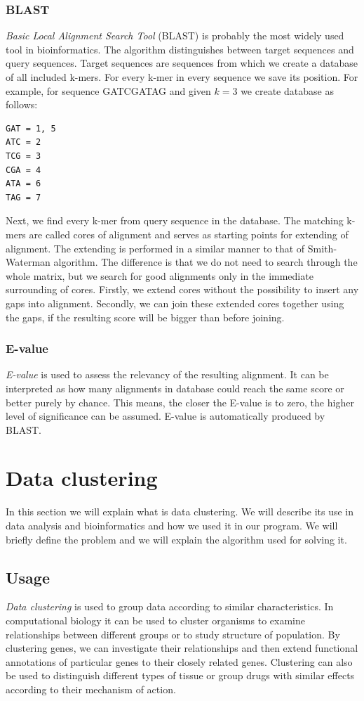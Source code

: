 \subsubsection{BLAST}
\emph{Basic Local Alignment Search Tool} (BLAST) \cite{blast} is probably the most widely used tool in bioinformatics.
The algorithm distinguishes between target sequences and query sequences.
Target sequences are sequences from which we create a database of all included k-mers.
For every k-mer in every sequence we save its position.
For example, for sequence GATCGATAG and given $k=3$ we create database as follows:
\begin{verbatim}
GAT = 1, 5
ATC = 2
TCG = 3
CGA = 4
ATA = 6
TAG = 7
\end{verbatim}
Next, we find every k-mer from query sequence in the database.
The matching k-mers are called cores of alignment and serves as starting points for extending of alignment.
The extending is performed in a similar manner to that of Smith-Waterman algorithm.
The difference is that we do not need to search through the whole matrix, but we search for good alignments only in the immediate surrounding of cores.
Firstly, we extend cores without the possibility to insert any gaps into alignment.
Secondly, we can join these extended cores together using the gaps, if the resulting score will be bigger than before joining.

\subsubsection{E-value}
\emph{E-value} is used to assess the relevancy of the resulting alignment.
It can be interpreted as how many alignments in database could reach the same score or better purely by chance.
This means, the closer the E-value is to zero, the higher level of significance can be assumed.
E-value is automatically produced by BLAST.

\section{Data clustering}
In this section we will explain what is data clustering.
We will describe its use in data analysis and bioinformatics and how we used it in our program.
We will briefly define the problem and we will explain the algorithm used for solving it.

\subsection{Usage}
\emph{Data clustering} is used to group data according to similar characteristics.
In computational biology it can be used to cluster organisms to examine relationships between different groups or to study structure of population.
By clustering genes, we can investigate their relationships and then extend functional annotations of particular genes to their closely related genes.
Clustering can also be used to distinguish different types of tissue or group drugs with similar effects according to their mechanism of action.

